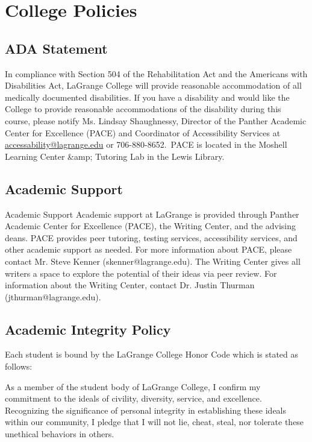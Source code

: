 \documentclass[11pt]{article}
\begin{document}
\section*{College Policies}

\subsection*{ADA Statement}

In compliance with Section 504 of the Rehabilitation Act and the Americans with Disabilities Act,
LaGrange College will provide reasonable accommodation of all medically documented disabilities. If you
have a disability and would like the College to provide reasonable accommodations of the disability during
this course, please notify Ms. Lindsay Shaughnessy, Director of the Panther Academic Center for
Excellence (PACE) and Coordinator of Accessibility Services at \href{mailto:accessability@lagrange.edu}{accessability@lagrange.edu} or 706-880-8652. PACE is located in the Moshell Learning Center &amp; Tutoring Lab in the Lewis Library.


\subsection*{Academic Support}

Academic Support
Academic support at LaGrange is provided through Panther Academic Center for Excellence (PACE), the
Writing Center, and the advising deans. PACE provides peer tutoring, testing services, accessibility
services, and other academic support as needed. For more information about PACE, please contact Mr.
Steve Kenner (skenner@lagrange.edu). The Writing Center gives all writers a space to explore the potential of their ideas via peer review. For information about the Writing Center, contact Dr. Justin Thurman
(jthurman@lagrange.edu).

\subsection*{Academic Integrity Policy}

Each student is bound by the LaGrange College Honor Code which is stated as follows:

\begin{displayquote}
As a member of the student body of LaGrange College, I confirm my
commitment to the ideals of civility, diversity, service, and excellence.
Recognizing the significance of personal integrity in establishing these ideals
within our community, I pledge that I will not lie, cheat, steal, nor tolerate these
unethical behaviors in others.
\end{displayquote}
\end{document}
